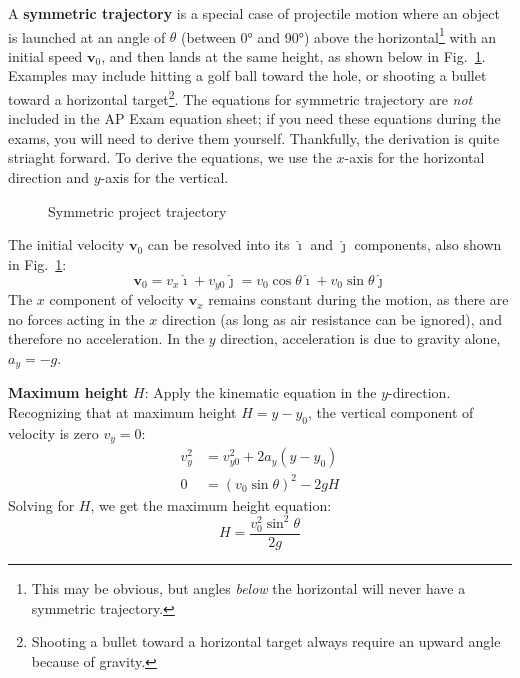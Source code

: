 \documentclass[11pt]{article}
\newcommand{\mb}[1]{\mathbf{#1}}
\newcommand{\iii}{\bm{\hat{\imath}}}
\newcommand{\jjj}{\bm{\hat{\jmath}}}
\begin{document}
A \textbf{symmetric trajectory} is a special case of projectile motion where an
object is launched at an angle of $\theta$ (between \ang{0} and \ang{90}) above
the horizontal\footnote{This may be obvious, but angles \emph{below} the 
  horizontal will never have a symmetric trajectory.} with an initial speed
$\mb{v}_0$, and then lands at the same height, as shown below in Fig.~\ref{sym}.
Examples may include hitting a golf ball toward the hole, or shooting a bullet
toward a horizontal target\footnote{Shooting a bullet toward a horizontal
  target always require an upward angle because of gravity.}. The equations for
symmetric trajectory are \emph{not} included in the AP Exam equation sheet; if
you need these equations during the exams, you will need to derive them
yourself. Thankfully, the derivation is quite striaght forward. To derive the
equations, we use the $x$-axis for the horizontal direction and $y$-axis for
the vertical.
\begin{figure}[ht]
  \begin{center}
  \end{center}
  \vspace{-.2in}
  \caption{Symmetric project trajectory}
  \label{sym}
\end{figure}

The initial velocity $\mb{v}_0$ can be resolved into its $\iii$ and $\jjj$
components, also shown in Fig.~\ref{sym}:
\begin{equation}
  \mb{v}_0
  =v_x\iii+v_{y0}\jjj
  =v_0\cos\theta\iii + v_0\sin\theta\jjj
\end{equation}
The $x$ component of velocity $\mb{v}_x$ remains constant during the motion, as
there are no forces acting in the $x$ direction (as long as air resistance can
be ignored), and therefore no acceleration. In the $y$ direction, acceleration
is due to gravity alone, $a_y=-g$.

\textbf{Maximum height} $H$: Apply the kinematic equation in the $y$-direction.
Recognizing that at maximum height $H=y-y_0$, the vertical component of
velocity is zero $v_y=0$:
\begin{align*}
  v_y^2 &= v_{y0}^2 + 2a_y(y-y_0)\\
  0  &= (v_0\sin\theta)^2-2gH
\end{align*}
Solving for $H$, we get the maximum height equation:
\begin{equation}
  \boxed{H=\frac{v_0^2\sin^2\theta}{2g}}
\end{equation}
\end{document}
